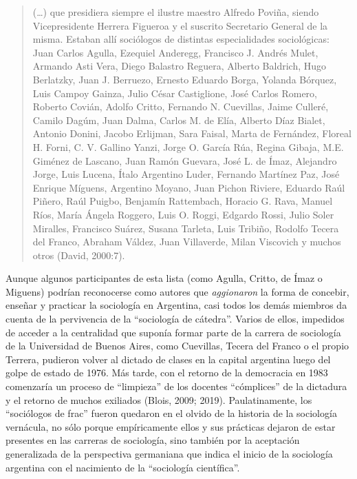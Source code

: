 \begin{quote}
(\ldots) que presidiera siempre el ilustre maestro Alfredo Poviña, siendo Vicepresidente Herrera Figueroa y el suscrito Secretario General de la misma. Estaban allí sociólogos de distintas especialidades sociológicas: Juan Carlos Agulla, Ezequiel Anderegg, Francisco J. Andrés Mulet, Armando Asti Vera, Diego Balastro Reguera, Alberto Baldrich, Hugo Berlatzky, Juan J. Berruezo, Ernesto Eduardo Borga, Yolanda Bórquez, Luis Campoy Gainza, Julio César Castiglione, José Carlos Romero, Roberto Covián, Adolfo Critto, Fernando N. Cuevillas, Jaime Culleré, Camilo Dagúm, Juan Dalma, Carlos M. de Elía, Alberto Díaz Bialet, Antonio Donini, Jacobo Erlijman, Sara Faisal, Marta de Fernández, Floreal H. Forni, C. V. Gallino Yanzi, Jorge O. García Rúa, Regina Gibaja, M.E. Giménez de Lascano, Juan Ramón Guevara, José L. de Ímaz, Alejandro Jorge, Luis Lucena, Ítalo Argentino Luder, Fernando Martínez Paz, José Enrique Míguens, Argentino Moyano, Juan Pichon Riviere, Eduardo Raúl Piñero, Raúl Puigbo, Benjamín Rattembach, Horacio G. Rava, Manuel Ríos, María Ángela Roggero, Luis O. Roggi, Edgardo Rossi, Julio Soler Miralles, Francisco Suárez, Susana Tarleta, Luis Tribiño, Rodolfo Tecera del Franco, Abraham Váldez, Juan Villaverde, Milan Viscovich y muchos otros (David, 2000:7).
\end{quote}

Aunque algunos participantes de esta lista (como Agulla, Critto, de Ímaz o Miguens) podrían reconocerse como autores que \emph{aggionaron} la forma de concebir, enseñar y practicar la sociología en Argentina, casi todos los demás miembros da cuenta de la pervivencia de la ``sociología de cátedra''. Varios de ellos, impedidos de acceder a la centralidad que suponía formar parte de la carrera de sociología de la Universidad de Buenos Aires, como Cuevillas, Tecera del Franco o el propio Terrera, pudieron volver al dictado de clases en la capital argentina luego del golpe de estado de 1976. Más tarde, con el retorno de la democracia en 1983 comenzaría un proceso de ``limpieza'' de los docentes ``cómplices'' de la dictadura y el retorno de muchos exiliados (Blois, 2009; 2019). Paulatinamente, los ``sociólogos de frac'' fueron quedaron en el olvido de la historia de la sociología vernácula, no sólo porque empíricamente ellos y sus prácticas dejaron de estar presentes en las carreras de sociología, sino también por la aceptación generalizada de la perspectiva germaniana que indica el inicio de la sociología argentina con el nacimiento de la ``sociología científica''.

